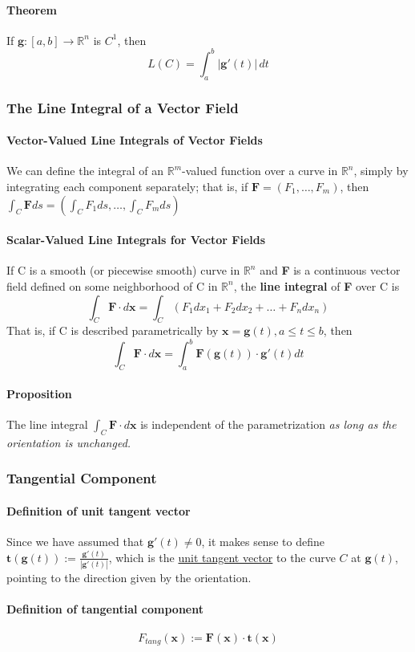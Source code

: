 \documentclass[11pt]{article}
\newcommand{\ti}[1]{\textit{#1}}
\newcommand{\tb}[1]{\textbf{#1}}
\newcommand{\real}[0]{\mathbb{R}}
\newcommand{\under}[1]{\underline{#1}}
\newcommand{\vx}[0]{\tb{x}}
\newcommand{\vf}[0]{\tb{F}}
\begin{document}
\paragraph{Theorem} If $\tb{g}: [a,b] \rightarrow \real^n$ is $C^1$, then
$$L(C) = \int_a^b|\tb{g}'(t)|\,dt$$

\subsubsection{The Line Integral of a Vector Field}
\paragraph{Vector-Valued Line Integrals of Vector Fields} We can define the integral of an $\real^m$-valued function over a curve in $\real^n$, simply by integrating each component separately; that is, if $\tb{F} = (F_1,\hdots,F_m)$, then $\int_C\tb{F}ds = (\int_C F_1ds,\hdots,\int_C F_mds)$
\paragraph{Scalar-Valued Line Integrals for Vector Fields} If C is a smooth (or piecewise smooth) curve in $\real^n$ and \tb{F} is a continuous vector field defined on some neighborhood of C in $\real^n$, the \tb{line integral} of \tb{F} over C is
$$\int_C \tb{F} \cdot d\vx = \int_C (F_1dx_1+F_2dx_2+\hdots+F_ndx_n)$$
That is, if C is described parametrically by $\vx = \tb{g}(t), a\leq t\leq b$, then
$$\int_C \tb{F} \cdot d\vx = \int_a^b\tb{F}(\tb{g}(t))\cdot \tb{g}'(t)dt$$
\paragraph{Proposition} The line integral $\int_C \vf \cdot d\vx$ is independent of the parametrization \ti{as long as the orientation is unchanged.}
\subsubsection{Tangential Component}
\paragraph{Definition of unit tangent vector}
Since we have assumed that $\tb{g}'(t) \neq 0$, it makes sense to define $\tb{t}(\tb{g}(t)):= \frac{\tb{g}'(t)}{|\tb{g}'(t)|}$, which is the \under{unit tangent vector} to the curve $C$ at $\tb{g}(t)$, pointing to the direction given by the orientation.
\paragraph{Definition of tangential component}
$$F_{tang}(\vx):=\vf(\vx)\cdot \tb{t}(\vx)$$
\end{document}

